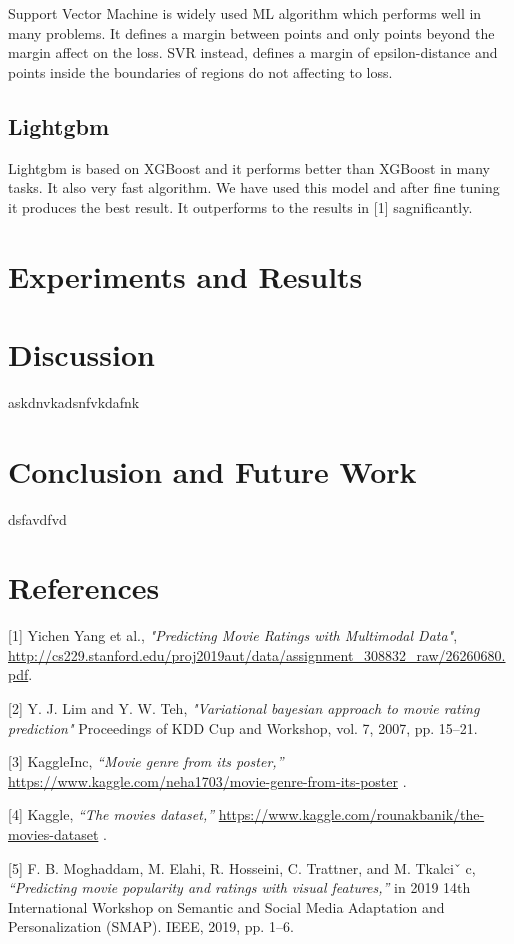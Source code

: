 \documentclass{article}
\begin{document}
Support Vector Machine is widely used ML algorithm which performs well in many problems. It defines a margin between points and only points beyond the margin affect on the loss. SVR instead, defines a margin of epsilon-distance and points inside the boundaries of regions do not affecting to loss. 

\subsection{Lightgbm}

Lightgbm is based on XGBoost and it performs better than XGBoost in many tasks. It also very fast algorithm. We have used this model and after fine tuning it produces the best result. It outperforms to the results in [1] sagnificantly. 

\section{Experiments and Results}


\section{Discussion}
askdnvkadsnfvkdafnk

\section{Conclusion and Future Work}

dsfavdfvd




\section*{References}
\label{reference}

\small

[1] Yichen Yang et al., {\it "Predicting Movie Ratings with Multimodal Data"},
\url{http://cs229.stanford.edu/proj2019aut/data/assignment_308832_raw/26260680.pdf}.

[2] Y. J. Lim and Y. W. Teh, {\it "Variational bayesian approach to movie rating prediction"}  Proceedings of KDD Cup and Workshop, vol. 7, 2007, pp. 15–21.

[3] KaggleInc, {\it “Movie genre from its poster,”} 
\url{https://www.kaggle.com/neha1703/movie-genre-from-its-poster} .

[4] Kaggle, {\it “The movies dataset,” } \url{https://www.kaggle.com/rounakbanik/the-movies-dataset} .

[5] F. B. Moghaddam, M. Elahi, R. Hosseini, C. Trattner, and M. Tkalciˇ c, {\it“Predicting movie popularity and ratings with visual features,” } in 2019 14th International Workshop on Semantic and Social Media Adaptation and Personalization (SMAP). IEEE, 2019, pp. 1–6.
\end{document}
